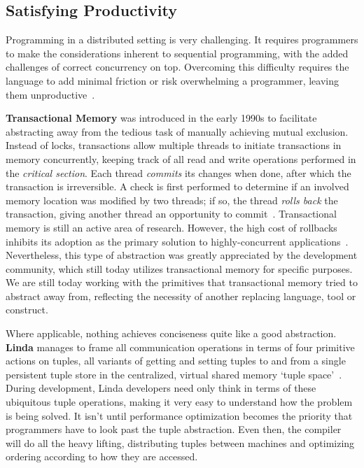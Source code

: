 \subsection{Satisfying Productivity} \label{how:clarity}

Programming in a distributed setting is very challenging. It requires programmers to make the considerations inherent to sequential programming, with the added challenges of correct concurrency on top. Overcoming this difficulty requires the language to add minimal friction or risk overwhelming a programmer, leaving them unproductive~\cite{langNec}.

 \textbf{Transactional Memory} was introduced in the early 1990s to facilitate abstracting away from the tedious task of manually achieving mutual exclusion. Instead of locks, transactions allow multiple threads to initiate transactions in memory concurrently, keeping track of all read and write operations performed in the \textit{critical section}. Each thread \textit{commits} its changes when done, after which the transaction is irreversible. A check is first performed to determine if an involved memory location was modified by two threads; if so, the thread \textit{rolls back} the transaction, giving another thread an opportunity to commit~\cite{TMIntroduced}. Transactional memory is still an active area of research. However, the high cost of rollbacks inhibits its adoption as the primary solution to highly-concurrent applications~\cite{TMNotSolution}. Nevertheless, this type of abstraction was greatly appreciated by the development community, which still today utilizes transactional memory for specific purposes. We are still today working with the primitives that transactional memory tried to abstract away from, reflecting the necessity of another replacing language, tool or construct.

Where applicable, nothing achieves conciseness quite like a good abstraction. \textbf{Linda} manages to frame all communication operations in terms of four primitive actions on tuples, all variants of getting and setting tuples to and from a single persistent tuple store in the centralized, virtual shared memory `tuple space'~\cite{linda}. During development, Linda developers need only think in terms of these ubiquitous tuple operations, making it very easy to understand how the problem is being solved. It isn't until performance optimization becomes the priority that programmers have to look past the tuple abstraction. Even then, the compiler will do all the heavy lifting, distributing tuples between machines and optimizing ordering according to how they are accessed.

